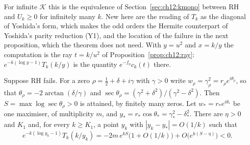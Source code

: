 For infinite $\mathcal K$ this is the equivalence of Section~\ref{sec:ch12:kmono} between RH and $U_k\ge0$ for infinitely many $k$. New here are the reading of $T_k$ as the diagonal of Yoshida's form, which makes the odd orders the Hermite counterpart of Yoshida's parity reduction (Y1), and the location of the failure in the next proposition, which the theorem does not need. With $y=u^2$ and $x=k/y$ the computation is the ray $t=k/u^2$ of Proposition~\ref{prop:ch12:ray}: $e^{-k(\log y-1)}T_k(k/y)$ is the quantity $e^{-f_0}c_k(t)$ there.

\begin{proposition}\label{yo:prop:saddle}
Suppose RH fails. For a zero $\rho=\frac12+\delta+i\gamma$ with $\gamma>0$ write $w_\rho=\gamma_\rho^2=r_\rho e^{i\theta_\rho}$, so that $\theta_\rho=-2\arctan(\delta/\gamma)$ and $\sec\theta_\rho=(\gamma^2+\delta^2)/(\gamma^2-\delta^2)$. Then $S=\max\log\sec\theta_\rho>0$ is attained, by finitely many zeros. Let $w_*=r_*e^{i\theta_*}$ be one maximiser, of multiplicity $m$, and $y_*=r_*\cos\theta_*=\gamma_*^2-\delta_*^2$. There are $\eta>0$ and $K_1$ and, for every $k\ge K_1$, a point $y_k$ with $|y_k-y_*|=O(1/k)$ such that
\[
e^{-k(\log y_k-1)}T_k(k/y_k)=-2m\,e^{kS}\bigl(1+O(1/k)\bigr)+O\bigl(e^{k(S-\eta)}\bigr)<0 .
\]
\end{proposition}

